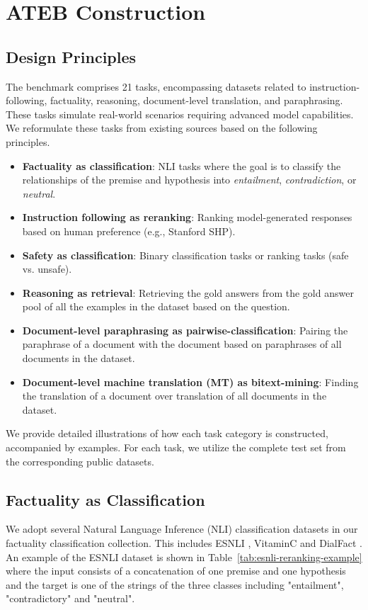 \section{ATEB Construction}
\subsection{Design Principles}
The benchmark comprises 21 tasks, encompassing datasets related to instruction-following, factuality, reasoning, document-level translation, and paraphrasing. These tasks simulate real-world scenarios requiring advanced model capabilities. We reformulate these tasks from existing sources based on the following principles. 
\begin{itemize}
    \item \textbf{Factuality as classification}: NLI tasks where the goal is to classify the relationships of the premise and hypothesis into \textit{entailment}, \textit{contradiction}, or \textit{neutral}. 
    \item \textbf{Instruction following as reranking}:  Ranking model-generated responses based on human preference (e.g., Stanford SHP).
    \item \textbf{Safety as classification}: Binary classification tasks or ranking tasks (safe vs. unsafe).
    \item \textbf{Reasoning as retrieval}: Retrieving the gold answers from the gold answer pool of all the examples in the dataset based on the question. 
    \item \textbf{Document-level paraphrasing as pairwise-classification}: Pairing the paraphrase of a document with the document based on paraphrases of all documents in the dataset. 
    \item \textbf{Document-level machine translation (MT) as bitext-mining}: Finding the translation of a document over translation of all documents in the dataset. 
\end{itemize}


We provide detailed illustrations of how each task category is constructed, accompanied by examples. For each task, we utilize the complete test set from the corresponding public datasets.

\subsection{Factuality as Classification}
We adopt several Natural Language Inference (NLI) classification datasets in our factuality classification collection. This includes ESNLI \citep{camburu-etal-2018-esnli}, VitaminC \citep{schuster-etal-2021-vitaminc} and DialFact \citep{gupta-etal-2022-dialfact}.  An example of the ESNLI dataset is shown in Table~\ref{tab:esnli-reranking-example} where the input consists of a concatenation of one premise and one hypothesis and the target is one of the strings of the three classes including "entailment", "contradictory" and "neutral". 


